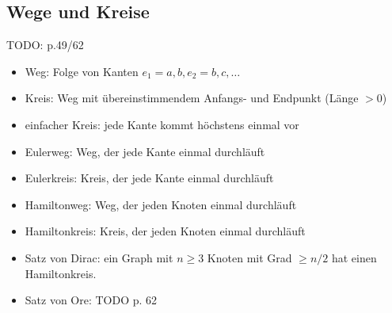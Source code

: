 \subsection{Wege und Kreise}

TODO: p.49/62

\begin{itemize}
\item{Weg: Folge von Kanten $e_1={a,b},e_2={b,c},\dots$}
\item{Kreis: Weg mit übereinstimmendem Anfangs- und Endpunkt (Länge $>0$)}
\item{einfacher Kreis: jede Kante kommt höchstens einmal vor}
\item{Eulerweg: Weg, der jede Kante einmal durchläuft}
\item{Eulerkreis: Kreis, der jede Kante einmal durchläuft}
\item{Hamiltonweg: Weg, der jeden Knoten einmal durchläuft}
\item{Hamiltonkreis: Kreis, der jeden Knoten einmal durchläuft}
\item{Satz von Dirac: ein Graph mit $n \geq 3$ Knoten mit Grad $\geq n/2$ hat einen Hamiltonkreis.}
\item{Satz von Ore: TODO p. 62}
\end{itemize}
